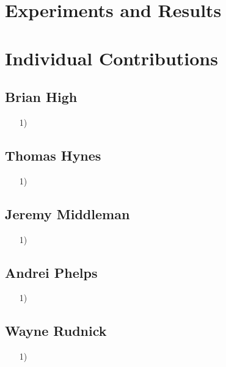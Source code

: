 \documentclass{article}
\begin{document}
\section*{Experiments and Results}

\section*{Individual Contributions}

\subsection*{Brian High}
\begin{itemize}
    \item[1)] 
\end{itemize}

\subsection*{Thomas Hynes}
\begin{itemize}
    \item[1)] 
\end{itemize}

\subsection*{Jeremy Middleman}
\begin{itemize}
    \item[1)] 
\end{itemize}

\subsection*{Andrei Phelps}
\begin{itemize}
    \item[1)] 
\end{itemize}

\subsection*{Wayne Rudnick}
\begin{itemize}
    \item[1)] 
\end{itemize}
\end{document}
